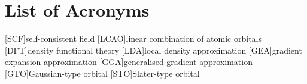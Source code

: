 
\chapter*{List of Acronyms}

\begin{acronym}[ABCDEFGHIJK]
    [SCF]{self-consistent field}
    [LCAO]{linear combination of atomic orbitals}
    [DFT]{density functional theory}
    [LDA]{local density approximation}
	[GEA]{gradient expansion approximation}
	[GGA]{generalised gradient approximation}
    [GTO]{Gaussian-type orbital}
    [STO]{Slater-type orbital}
\end{acronym}
